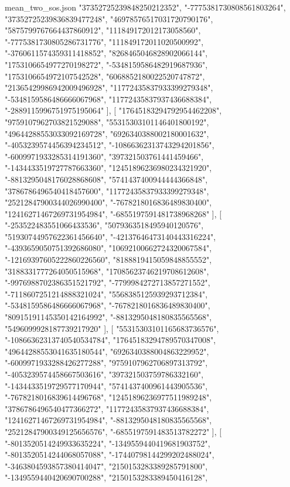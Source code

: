 \begin{filecontents*}[overwrite]{mean_two_sos.json}
    "37352725239848250212352",
    "-7775381730808561803264",
    "37352725239836839477248",
    "46978576517031720790176",
    "5875799767664437860912",
    "111849172012173058560",
    "-7775381730805286731776",
    "111849172011020500992",
    "-3760611574359311418852",
    "8268465046828902066144",
    "1753106654977270198272",
    "-5348159586482919687936",
    "1753106654972107542528",
    "6068852180022520747872",
    "21365429986942009496928",
    "11772435837933399279348",
    "-5348159586486666067968",
    "11772435837937436688384",
    "-2889115996751975195064"
   ],
   [
    "17645183294792954462208",
    "9759107962703821529088",
    "55315303101146401800192",
    "49644288553033092169728",
    "6926340388002180001632",
    "-4053239574456394234512",
    "-10866362313743294201856",
    "-6009971933285314191360",
    "397321503761441459466",
    "-1434433519727787663360",
    "12451896236980234321920",
    "-8813295048176028868608",
    "5741437400944444366848",
    "3786786496540418457600",
    "11772435837933399279348",
    "25212847900344026990400",
    "-7678218016836489830400",
    "12416271467269731954984",
    "-6855197591481738968268"
   ],
   [
    "-253522483551066433536",
    "5079363518495940120576",
    "51930744957622361456640",
    "-42137646473140443316224",
    "-4393659050751392686080",
    "10692100662724320067584",
    "-12169397605222860226560",
    "8188819415059848855552",
    "3188331777264050515968",
    "17085623746219708612608",
    "-9976988702386351521792",
    "-7799984272713857271552",
    "-7118607251214888321024",
    "5568385125939293712384",
    "-5348159586486666067968",
    "-7678218016836489830400",
    "80915191145350142164992",
    "-8813295048180835565568",
    "5496099928187739217920"
   ],
   [
    "55315303101165683736576",
    "-10866362313740540534784",
    "17645183294789570347008",
    "49644288553041635180544",
    "6926340388004863229952",
    "-6009971933288426277288",
    "9759107962706897313792",
    "-4053239574458667503616",
    "397321503759786332160",
    "-1434433519729577170944",
    "5741437400961443905536",
    "-7678218016839614496768",
    "12451896236977511989248",
    "3786786496540477366272",
    "11772435837937436688384",
    "12416271467269731954984",
    "-8813295048180835565568",
    "25212847900349125656576",
    "-6855197591483513782272"
   ],
   [
    "-8013520514249933635224",
    "-1349559440419681903752",
    "-8013520514244068057088",
    "-17440798144299202488024",
    "-3463804593857380414047",
    "2150153283389285791800",
    "-1349559440420690700288",
    "2150153283389450416128",

\end{filecontents*}
